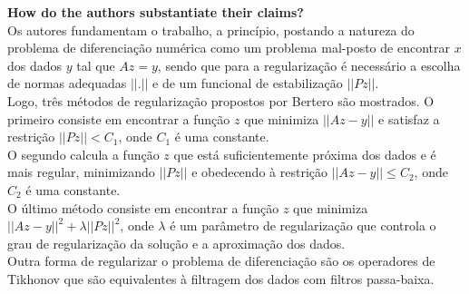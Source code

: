 \begin{enumerate}
\begin{enumerate}[label*=\arabic*.]
    \textbf{How do the authors substantiate their claims?}\\
    Os autores fundamentam o trabalho, a princípio, postando a natureza do problema de diferenciação numérica como um problema mal-posto de encontrar $x$ dos dados $y$ tal que $Az = y$, sendo que para a regularização é necessário a escolha de normas adequadas $||.||$ e de um funcional de estabilização $||Pz||$.\\
    Logo, três métodos de regularização propostos por Bertero são mostrados. O primeiro consiste em encontrar a função $z$ que minimiza $||Az - y||$ e satisfaz a restrição $||Pz|| < C_{1}$, onde $C_{1}$ é uma constante.\\
    O segundo calcula a função $z$ que está suficientemente próxima dos dados e é mais regular, minimizando $||Pz||$ e obedecendo à restrição $||Az - y|| \leq C_{2}$, onde $C_{2}$ é uma constante.\\
    O último método consiste em encontrar a função $z$ que minimiza $||Az - y||^2 + \lambda ||Pz||^2$, onde $\lambda$ é um parâmetro de regularização que controla o grau de regularização da solução e a aproximação dos dados.\\
    Outra forma de regularizar o problema de diferenciação são os operadores de Tikhonov que são equivalentes à filtragem dos dados com filtros passa-baixa.\\
    

\end{enumerate}
\end{enumerate}
